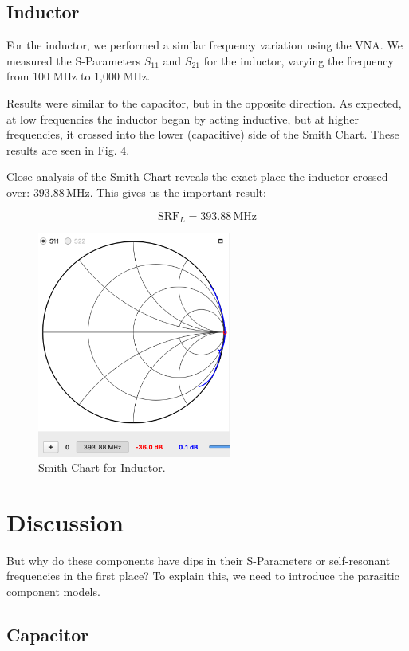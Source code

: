 \documentclass[lettersize,journal]{IEEEtran}
\begin{document}
\subsection{Inductor}

For the inductor, we performed a similar frequency variation using the VNA. We measured the S-Parameters $S_{11}$ and $S_{21}$ for the inductor, varying the frequency from 100 MHz to 1,000 MHz.

Results were similar to the capacitor, but in the opposite direction. As expected, at low frequencies the inductor began by acting inductive, but at higher frequencies, it crossed into the lower (capacitive) side of the Smith Chart. These results are seen in Fig. 4.

Close analysis of the Smith Chart reveals the exact place the inductor crossed over: $393.88 \, \text{MHz}$. This gives us the important result:

\begin{equation}
\text{SRF}_L = 393.88 \, \text{MHz}
\end{equation}

\begin{figure}[!t]
\centering
\includegraphics[width=2.5in]{inductor-smith}
\caption{Smith Chart for Inductor.}
\label{fig_1}
\end{figure}

\section{Discussion}

But why do these components have dips in their S-Parameters or self-resonant frequencies in the first place? To explain this, we need to introduce the parasitic component models.

\subsection{Capacitor}
\end{document}
